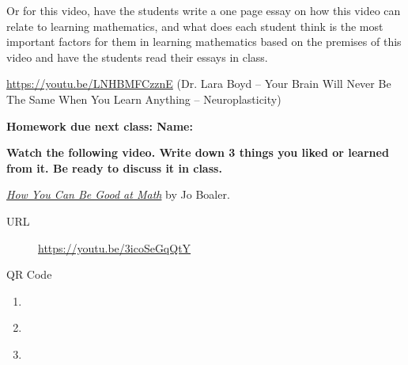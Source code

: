 \documentclass{article}
\begin{document}
\begin{notes}
  Or for this video, have the students write a one page essay on how this video can relate to learning mathematics, and what does each student think is the most important factors for them in learning mathematics based on the premises of this video and have the students read their essays in class.

\url{https://youtu.be/LNHBMFCzznE} (Dr. Lara Boyd – Your Brain Will Never Be The Same When You Learn Anything – Neuroplasticity) 
\end{notes}

\clearpage

\textbf{Homework due next class:  \hfill Name: \underline{\hspace{2in}}}

\textbf{Watch the following video. Write down 3 things you liked or learned from it. Be ready to discuss it in class.}

\href{https://youtu.be/3icoSeGqQtY}{\emph{How You Can Be Good at Math}} by Jo Boaler.
\begin{description}
\item[URL] \url{https://youtu.be/3icoSeGqQtY}
\item[QR Code]  
\end{description}

\vspace{0.25in}

\begin{enumerate}[label=\textbf{\arabic*.}]
\item \

  \vfill
  
\item \

  \vfill
  
\item \

  \vfill
  
\end{enumerate}
\end{document}
